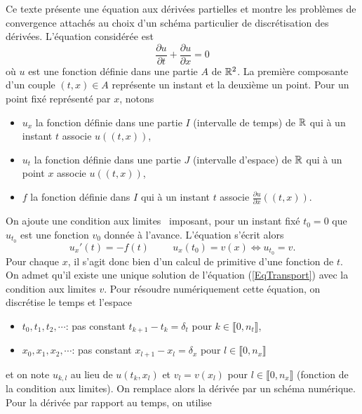 Ce texte présente une équation aux dérivées partielles et montre les problèmes de convergence attachés au choix d'un schéma particulier de discrétisation des dérivées. L'équation considérée est
\begin{equation}
 \frac{\partial u}{\partial t} + \frac{\partial u}{\partial x} = 0 \label{EqTransport}
\end{equation}
où $u$ est une fonction définie dans une partie $A$ de $\mathbb{R}^2$. La première composante d'un couple $(t,x)\in A$ représente un instant et la deuxième un point.\newline
Pour un point fixé représenté par $x$, notons 
\begin{itemize}
 \item $u_x$ la fonction définie dans une partie $I$ (intervalle de temps) de $\mathbb{R}$ qui à un instant $t$ associe $u((t,x))$,  
 \item $u_t$ la fonction définie dans une partie $J$ (intervalle d'espace) de $\mathbb{R}$ qui à un point $x$ associe $u((t,x))$,  
 \item $f$ la fonction définie dans $I$ qui à un instant $t$ associe $\frac{\partial u}{\partial x}((t,x))$.
\end{itemize}
On ajoute une \og condition aux limites\fg~ imposant, pour un instant fixé $t_0=0$ que $u_{t_0}$ est une fonction $v_0$ donnée à l'avance. L'équation s'écrit alors
\[
 u_x'(t) = -f(t) \hspace{1cm} u_x(t_0) = v(x) \Leftrightarrow u_{t_0}=v.
\]
Pour chaque $x$, il s'agit donc bien d'un calcul de primitive d'une fonction de $t$.\newline
On admet qu'il existe une unique solution de l'équation (\ref{EqTransport}) avec la condition aux limites $v$.\newline
Pour résoudre numériquement cette équation, on discrétise le temps et l'espace
\begin{itemize}
 \item $t_0, t_1, t_2, \cdots $: pas constant $t_{k+1} - t_k = \delta_t$ pour $k\in \llbracket 0, n_t \rrbracket$,
 \item $x_0, x_1, x_2, \cdots$:  pas constant $x_{l+1} - x_l = \delta_x$ pour $l\in \llbracket 0, n_x \rrbracket$
\end{itemize}
et on note $u_{k,l}$ au lieu de $u(t_k,x_l)$ et $v_l = v(x_l)$ pour $l\in \llbracket 0, n_x\rrbracket$ (fonction de la condition aux limites). On remplace alors la dérivée par un schéma numérique.\newline
Pour la dérivée par rapport au temps, on utilise
